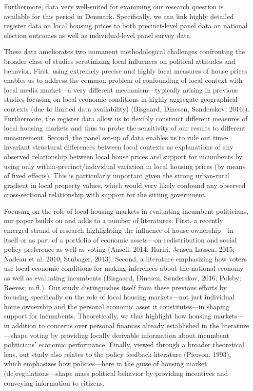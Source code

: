 \documentclass[12pt,a4paper]{article}
\begin{document}
Furthermore, data very well-suited for examining our research question is available for this period in Denmark. Specifically, we can link highly detailed register data on local housing prices to both precinct-level panel data on national election outcomes as well as individual-level panel survey data. 

These data ameliorates two immanent methodological challenges confronting the broader class of studies scrutinizing local influences on political attitudes and behavior. First, using extremely precise and highly local measures of house prices enables us to address the common problem of confounding of local context with local media market—a very different mechanism—typically arising in previous studies focusing on local economic conditions in highly aggregate geographical contexts (due to limited data availability) (Bisgaard, Dinesen, Sønderskov, 2016;). Furthermore, the register data allow us to flexibly construct different measures of local housing markets and thus to probe the sensitivity of our results to different measurement. Second, the panel set-up of data enables us to rule out time-invariant structural differences between local contexts as explanations of any observed relationship between local house prices and support for incumbents by using only within-precinct/individual variation in local housing prices (by means of fixed effects). This is particularly important given the strong urban-rural gradient in local property values, which would very likely confound any observed cross-sectional relationship with support for the sitting government. 

Focusing on the role of local housing markets in evaluating incumbent politicians, our paper builds on and adds to a number of literatures. First, a recently emerged strand of research highlighting the influence of house ownership—in itself or as part of a portfolio of economic assets—on redistribution and social policy preference as well as voting (Ansell, 2014; Hariri, Jensen Lassen, 2015; Nadeau et al. 2010; Stubager, 2013). Second, a literature emphasizing how voters use local economic conditions for making inferences about the national economy as well as evaluating incumbents (Bisgaard, Dinesen, Sønderskov, 2016; Polsby; Reeves; m.fl.). Our study distinguishes itself from these previous efforts by focusing specifically on the role of local housing markets—not just individual home ownership and the personal economic asset it constitutes—in shaping support for incumbents. Theoretically, we thus highlight how housing markets—in addition to concerns over personal finances already established in the literature—shape voting by providing locally derivable information about incumbent politicians’ economic performance. Finally, viewed through a broader theoretical lens, out study also relates to the policy feedback literature (Pierson, 1993), which emphasizes how policies—here in the guise of housing market (de)regulations—shape mass political behavior by providing incentives and conveying information to citizens.
\end{document}
